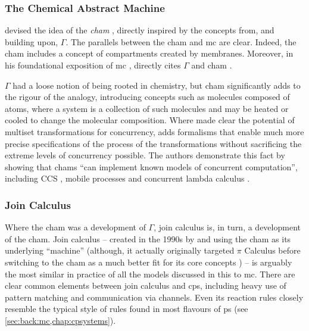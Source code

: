 \subsubsection{The Chemical Abstract Machine}
\citeauthor{Berry1992} devised the idea of the \emph{\gls{cham}} \cite{Berry1992}, directly inspired by the concepts from, and building upon, \(\Gamma\).  The parallels between the \gls{cham} and \gls{mc} are clear.  Indeed, the \gls{cham} includes a concept of \glspl{compartment} created by membranes.  Moreover, in his foundational exposition of \gls{mc} \cite{Paun2000}, \citeauthor{Paun2000} directly cites \(\Gamma\) \cite{Banatre1988} and \gls{cham} \cite{Berry1992}.

\(\Gamma\) had a loose notion of being rooted in chemistry, but \gls{cham} significantly adds to the rigour of the analogy, introducing concepts such as molecules composed of atoms, where a system is a collection of such molecules and may be heated or cooled to change the molecular composition.  Where \cite{Banatre1993} made clear the potential of multiset transformations for concurrency, \cite{Berry1992} adds formalisms that enable much more precise specifications of the process of the transformations without sacrificing the extreme levels of concurrency possible.  The authors demonstrate this fact by showing that \glspl{cham} \enquote{can implement known models of concurrent computation}, including CCS \cite{Milner1980}, mobile processes \cite{Milner1991} and concurrent lambda calculus \cite{Boudol1989}.

\subsubsection{Join Calculus}
Where the \gls{cham} was a development of \(\Gamma\), join calculus is, in turn, a development of the \gls{cham}.  Join calculus -- created in the 1990s by \citeauthor{Fournet1996} \cite{Fournet1996,Fournet2002} and using the \gls{cham} as its underlying ``machine'' (although, it actually originally targeted \(\pi\) Calculus before switching to the \gls{cham} as a much better fit for its core concepts \cite{Fournet2002}) -- is arguably the most similar in practice of all the models discussed in this  to \gls{mc}.  There are clear common elements between join calculus and \gls{cps}, including heavy use of pattern matching and communication via channels.  Even its reaction rules closely resemble the typical style of rules found in most flavours of \gls{ps} (see \cref{sec:back:mc,chap:cpsystems}).

